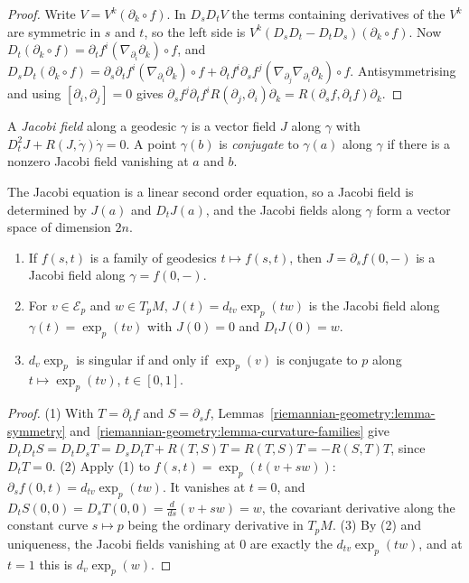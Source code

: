 \begin{proof}
Write $V = V^k(\partial_k \circ f)$. In $D_sD_tV$ the terms containing derivatives of the $V^k$ are symmetric in $s$ and $t$, so the left side is $V^k(D_sD_t - D_tD_s)(\partial_k \circ f)$. Now
$D_t(\partial_k \circ f) = \partial_tf^i(\nabla_{\partial_i}\partial_k) \circ f$, and
$D_sD_t(\partial_k \circ f) = \partial_s\partial_tf^i(\nabla_{\partial_i}\partial_k) \circ f + \partial_tf^i\partial_sf^j(\nabla_{\partial_j}\nabla_{\partial_i}\partial_k) \circ f$. Antisymmetrising and using $[\partial_i, \partial_j] = 0$ gives
$\partial_sf^j\partial_tf^iR(\partial_j, \partial_i)\partial_k = R(\partial_sf, \partial_tf)\partial_k$.
\end{proof}

\begin{definition}\label{riemannian-geometry:definition-jacobi}
A \emph{Jacobi field} along a geodesic $\gamma$ is a vector field $J$ along $\gamma$ with $D_t^2J + R(J, \dot\gamma)\dot\gamma = 0$. A point $\gamma(b)$ is \emph{conjugate} to $\gamma(a)$ along $\gamma$ if there is a nonzero Jacobi field
vanishing at $a$ and $b$.
\end{definition}

The Jacobi equation is a linear second order equation, so a Jacobi field is determined by $J(a)$ and $D_tJ(a)$, and the Jacobi fields along $\gamma$ form a vector space of dimension $2n$.

\begin{proposition}\label{riemannian-geometry:proposition-jacobi}
\begin{enumerate}
\item If $f(s, t)$ is a family of geodesics $t \mapsto f(s, t)$, then $J = \partial_sf(0, -)$ is a Jacobi field along $\gamma = f(0, -)$.
\item For $v \in \mathcal{E}_p$ and $w \in T_pM$, $J(t) = d_{tv}\exp_p(tw)$ is the Jacobi field along $\gamma(t) = \exp_p(tv)$ with $J(0) = 0$ and $D_tJ(0) = w$.
\item $d_v\exp_p$ is singular if and only if $\exp_p(v)$ is conjugate to $p$ along $t \mapsto \exp_p(tv)$, $t \in [0, 1]$.
\end{enumerate}
\end{proposition}

\begin{proof}
(1) With $T = \partial_tf$ and $S = \partial_sf$, Lemmas~\ref{riemannian-geometry:lemma-symmetry} and~\ref{riemannian-geometry:lemma-curvature-families} give
$D_tD_tS = D_tD_sT = D_sD_tT + R(T, S)T = R(T, S)T = -R(S, T)T$, since $D_tT = 0$. (2) Apply (1) to $f(s, t) = \exp_p(t(v + sw))$: $\partial_sf(0, t) = d_{tv}\exp_p(tw)$. It vanishes at $t = 0$, and
$D_tS(0, 0) = D_sT(0, 0) = \frac{d}{ds}(v + sw) = w$, the covariant derivative along the constant curve $s \mapsto p$ being the ordinary derivative in $T_pM$. (3) By (2) and uniqueness, the Jacobi fields vanishing at $0$ are exactly the
$d_{tv}\exp_p(tw)$, and at $t = 1$ this is $d_v\exp_p(w)$.
\end{proof}

